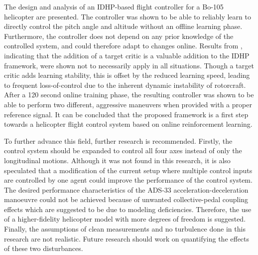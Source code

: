 The design and analysis of an IDHP-based flight controller for a Bo-105 helicopter are presented. The controller was shown to be able to reliably learn to directly control the pitch angle and altitude without an offline learning phase. Furthermore, the controller does not depend on any prior knowledge of the controlled system, and could therefore adapt to changes online. Results from \cite{Heyer2020}, indicating that the addition of a target critic is a valuable addition to the IDHP framework, were shown not to necessarily apply in all situations. Though a target critic adds learning stability, this is offset by the reduced learning speed, leading to frequent loss-of-control due to the inherent dynamic instability of rotorcraft. After a 120 second online training phase, the resulting controller was shown to be able to perform two different, aggressive maneuvers when provided with a proper reference signal. It can be concluded that the proposed framework is a first step towards a helicopter flight control system based on online reinforcement learning.

To further advance this field, further research is recommended. Firstly, the control system should be expanded to control all four axes instead of only the longitudinal motions. Although it was not found in this research, it is also speculated that a modification of the current setup where multiple control inputs are controlled by one agent could improve the performance of the control system.  The desired performance characteristics of the ADS-33 acceleration-deceleration manoeuvre could not be achieved because of unwanted collective-pedal coupling effects which are suggested to be due to modeling deficiencies. Therefore, the use of a higher-fidelity helicopter model with more degrees of freedom is suggested. Finally, the assumptions of clean measurements and no turbulence done in this research are not realistic. Future research should work on quantifying the effects of these two disturbances. 